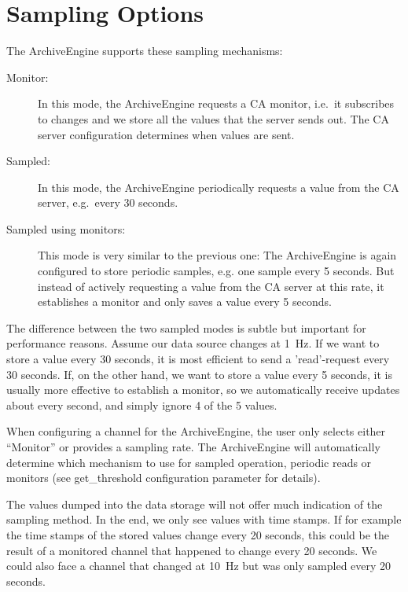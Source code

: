 \section{Sampling Options} %
The ArchiveEngine supports these sampling mechanisms:
\begin{description}
\item[\sffamily Monitor:]
In this mode, the ArchiveEngine requests a CA monitor, i.e.\ it
subscribes to changes and we store all the values that the server
sends out. The CA server configuration determines when values are sent.

\item[\sffamily Sampled:]
In this mode, the ArchiveEngine periodically requests a value from
the CA server, e.g.\ every 30 seconds.

\item[\sffamily Sampled using monitors:]
This mode is very similar to the previous one:
The ArchiveEngine is again configured to store periodic samples,
e.g. one sample every 5 seconds. But instead of actively requesting a
value from the CA server at this rate, it establishes a monitor and
only saves a value every 5 seconds.
\end{description}

\noindent The difference between the two sampled modes is subtle but important
for performance reasons. Assume our data source changes at 1~Hz. If
we want to store a value every 30 seconds, it is most efficient to
send a 'read'-request every 30 seconds. If, on the other hand, we want
to store a value every 5 seconds, it is usually more effective to
establish a monitor, so we automatically receive updates about every
second, and simply ignore 4 of the 5 values.

When configuring a channel for the ArchiveEngine, the user only
selects either ``Monitor'' or provides a sampling rate.
The ArchiveEngine will automatically determine which mechanism to use
for sampled operation, periodic reads or monitors
(see get\_threshold configuration parameter for details).

\NOTE The values dumped into the data storage will not offer much
indication of the sampling method. In the end, we only see values with
time stamps. If for example the time stamps of the stored values
change every 20 seconds, this could be the result of a monitored
channel that happened to change every 20 seconds. We could also face a
channel that changed at 10~Hz but was only sampled every 20 seconds. 

